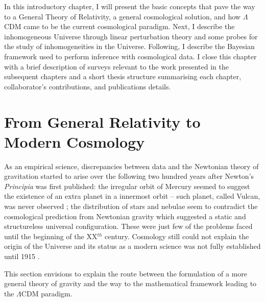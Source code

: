 \qquad In this introductory chapter, I will present the basic concepts that pave the way to a General Theory of Relativity, a general cosmological solution, and how $\Lambda$CDM came to be the current cosmological paradigm. Next, I describe the inhomogeneous Universe through linear perturbation theory and some probes for the study of inhomogeneities in the Universe. Following, I describe the Bayesian framework used to perform inference with cosmological data. I close this chapter with a brief description of surveys relevant to the work presented in the subsequent chapters and a short thesis structure summarising each chapter, collaborator's contributions, and publications details. 

\section{From General Relativity to Modern Cosmology} \label{Sec:Intro:GR}
As an empirical science, discrepancies between data and the Newtonian theory of gravitation started to arise over the following two hundred years after Newton's \textit{Principia} was first published: the irregular orbit of Mercury seemed to suggest the existence of an extra planet in a innermost orbit -- such planet, called Vulcan, was never observed \citep{1859Mercury}; the distribution of stars and nebulae seem to contradict the cosmological prediction from Newtonian gravity which suggested a static and structureless universal configuration. These were just few of the problems faced until the beginning of the XX$^{th}$ century. Cosmology still could not explain the origin of the Universe and its status as a modern science was not fully established until 1915 \citep{Gleiser}.

\qquad This section envisions to explain the route between the formulation of a more general theory of gravity and the way to the mathematical framework leading to the $\Lambda$CDM paradigm.


